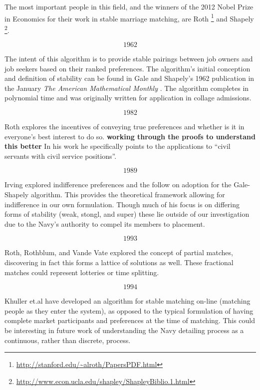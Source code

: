 The most important people in this field, and the winners of the 2012 Nobel Prize in Economics for their work in stable marriage matching, are Roth \footnote{\url{http://stanford.edu/~alroth/PapersPDF.html}} and Shapely \footnote{\url{http://www.econ.ucla.edu/shapley/ShapleyBiblio.1.html}}.

\[1962\]

The intent of this algorithm is to provide stable pairings between job owners and job seekers based on their ranked preferences. The algorithm's initial conception and definition of stability can be found in Gale and Shapely's 1962 publication in the January \textit{The American Mathematical Monthly} \cite{gale_shapely}. The algorithm completes in polynomial time and was originally written for application in collage admissions.

\[1982\]

Roth explores the incentives of conveying true preferences and whether is it in everyone's best interest to do so. \cite{incentives} \textbf{working through the proofs to understand this better} In his work he specifically points to the applications to ``civil servants with civil service positions''.

\[1989\]

Irving explored indifference preferences and the follow on adoption for the Gale-Shapely algorithm. \cite{indifference} This provides the theoretical framework allowing for indifference in our own formulation. Though much of his focus is on differing forms of stability (weak, stongl, and super) these lie outside of our investigation due to the Navy's authority to compel its members to placement.

\[1993\]

Roth, Rothblum, and Vande Vate explored the concept of partial matches, discovering in fact this forms a lattice of solutions as well. These fractional matches could represent lotteries or time splitting. \cite{partial}

\[1994\]

Khuller et.al have developed an algorithm for stable matching on-line (matching people as they enter the system), as opposed to the typical formulation of having complete market participants and preferences at the time of matching. \cite{online} This could be interesting in future work of understanding the Navy detailing process as a continuous, rather than discrete, process.